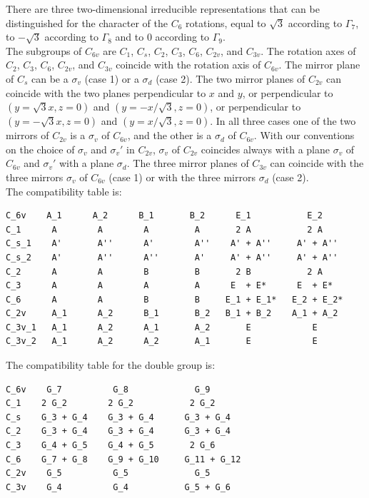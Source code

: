 \documentclass[12pt,a4paper]{article}
\begin{document}
There are three two-dimensional irreducible representations that can be 
distinguished for the character of the $C_6$ rotations, equal to $\sqrt{3}$
according to $\Gamma_7$, to $-\sqrt{3}$ according to $\Gamma_8$ and to
$0$ according to $\Gamma_9$.\\
The subgroups of $C_{6v}$ are $C_1$, $C_s$, $C_2$, $C_3$, $C_6$,
$C_{2v}$, and $C_{3v}$. The rotation axes of $C_2$, $C_3$, $C_6$, $C_{2v}$,
and $C_{3v}$ coincide with the rotation axis of $C_{6v}$. The mirror 
plane of $C_s$ can be a $\sigma_v$ (case 1) or a $\sigma_d$ (case 2). The two 
mirror planes of $C_{2v}$
can coincide with the two planes perpendicular to $x$ and $y$, 
or perpendicular to $(y=\sqrt{3} x, z=0)$ and $(y=-x /\sqrt{3}, z=0)$,
or perpendicular to $(y=-\sqrt{3} x, z=0)$ and $(y=x /\sqrt{3}, z=0)$.
In all three cases one of the two mirrors of $C_{2v}$ is a $\sigma_v$ of $C_{6v}$,
and the other is a $\sigma_d$ of $C_{6v}$. With our conventions on the choice of 
$\sigma_v$ and $\sigma_v'$ in $C_{2v}$, $\sigma_v$ of $C_{2v}$
coincides always with a plane $\sigma_v$ of $C_{6v}$ and $\sigma_v'$ with a 
plane $\sigma_d$.
The three mirror planes of $C_{3v}$ can coincide with the three mirrors 
$\sigma_v$ of $C_{6v}$ (case 1) or with the three mirrors $\sigma_d$ (case 2).\\
The compatibility table is:
\begin{verbatim}
C_6v    A_1      A_2      B_1       B_2      E_1           E_2
C_1      A        A        A         A       2 A           2 A
C_s_1    A'       A''      A'        A''    A' + A''     A' + A''
C_s_2    A'       A''      A''       A'     A' + A''     A' + A''
C_2      A        A        B         B       2 B           2 A
C_3      A        A        A         A      E  + E*      E  + E*
C_6      A        A        B         B     E_1 + E_1*   E_2 + E_2*
C_2v     A_1      A_2      B_1       B_2   B_1 + B_2    A_1 + A_2
C_3v_1   A_1      A_2      A_1       A_2       E            E  
C_3v_2   A_1      A_2      A_2       A_1       E            E
\end{verbatim}
The compatibility table for the double group is:
\begin{verbatim}
C_6v    G_7          G_8             G_9
C_1    2 G_2        2 G_2           2 G_2
C_s    G_3 + G_4    G_3 + G_4      G_3 + G_4
C_2    G_3 + G_4    G_3 + G_4      G_3 + G_4
C_3    G_4 + G_5    G_4 + G_5       2 G_6
C_6    G_7 + G_8    G_9 + G_10     G_11 + G_12
C_2v    G_5          G_5             G_5
C_3v    G_4          G_4           G_5 + G_6
\end{verbatim}
\end{document}
